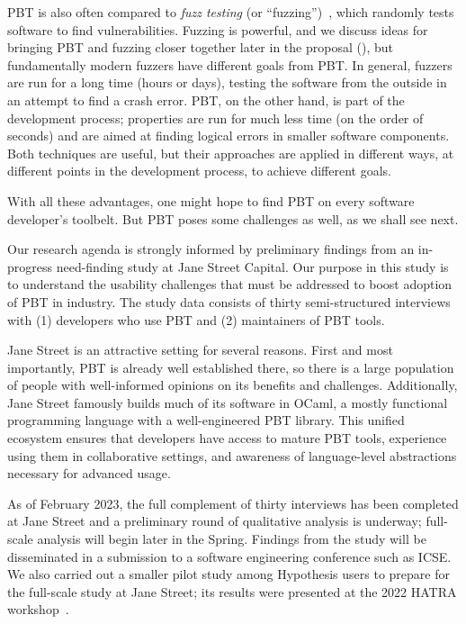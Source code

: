 PBT is also often compared to {\em fuzz testing} (or
``fuzzing'')~\cite{afl-readme}, which randomly tests software to find
vulnerabilities. Fuzzing is powerful, and we discuss ideas for bringing PBT and
fuzzing closer together later in the proposal
(), but fundamentally modern fuzzers have
different goals from PBT. In general, fuzzers are run for a long time (hours or
days), testing the software from the outside in an attempt to find a crash
error. PBT, on the other hand, is part of the development process; properties
are run for much less time (on the order of seconds) and are aimed at finding
logical errors in smaller software components. Both techniques are useful, but
their approaches are applied in different ways, at different points in the
development process, to achieve different goals.

With all these advantages, one might hope to find PBT on every
software developer's toolbelt.  But PBT poses some challenges as well,
as we shall see next.

%
Our research agenda is strongly informed by preliminary findings from
an in-progress need-finding study at Jane Street Capital.  Our purpose
in this
study is to understand the usability challenges that must be addressed
to boost adoption of PBT in
industry. The study data consists of thirty semi-structured interviews
with (1) developers who use PBT and (2) maintainers of PBT tools.

Jane Street is
an attractive setting for several reasons.  First and most
importantly, PBT is
already well established there, so there is a large
population of people with well-informed opinions on its benefits and
challenges. Additionally, Jane Street famously builds much of its
software in OCaml, a mostly functional programming language with
a well-engineered PBT library. This unified
ecosystem ensures that developers have access to mature PBT tools,
experience using them in collaborative settings,
and awareness of language-level abstractions necessary
for advanced usage.

As of February 2023, the full complement of thirty interviews has been
completed at Jane Street and a preliminary round of qualitative
analysis is underway; full-scale analysis will begin later in the Spring.
Findings from the study will be disseminated in a submission to a
software engineering conference such as ICSE.  We also carried out a
smaller pilot study among Hypothesis users to prepare for the
full-scale study at Jane Street; its results were presented at the
2022 HATRA workshop~\cite{goldstein_problems_2022}.

